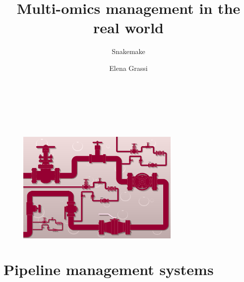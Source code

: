 \documentclass[xcolor=table]{beamer}
\title{\textbf{Multi-omics management in the real world}}
\subtitle{Snakemake}
\author{Elena Grassi}
\begin{document}
\begin{frame}
	\begin{center} \inserttitle

	\vspace{1cm}
	\insertauthor  \\
    \small{\textit{\insertsubtitle \\}}
	\insertdate \\ \vspace{1cm}
	\begin{figure}\includegraphics[width=0.7\textwidth]{./img/pipe.png}\end{figure}
	\end{center}
\end{frame}


\section{Pipeline management systems}
\end{document}
